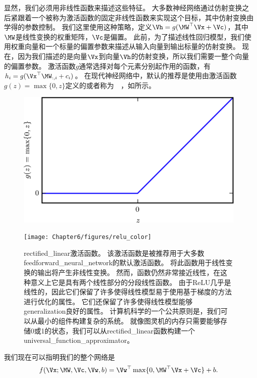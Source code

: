 
显然，我们必须用非线性函数来描述这些特征。
大多数神经网络通过仿射变换之后紧跟着一个被称为激活函数的固定非线性函数来实现这个目标，其中仿射变换由学得的参数控制。
我们这里使用这种策略，定义$\Vh=g(\MW^\top \Vx+\Vc)$，其中$\MW$是线性变换的权重矩阵，$\Vc$是偏置。
此前，为了描述线性回归模型，我们使用权重向量和一个标量的偏置参数来描述从输入向量到输出标量的仿射变换。
现在，因为我们描述的是向量$\Vx$到向量$\Vh$的仿射变换，所以我们需要一整个向量的偏置参数。
激活函数$g$通常选择对每个元素分别起作用的函数，有$h_i =g(\Vx^\top \MW_{:, i} + c_i)$。
在现代神经网络中，默认的推荐是使用由激活函数$g(z)=\max\{0, z\}$定义的或者称为~~\citep{Jarrett-et-al-2009,Nair-Hinton-2010,Glorot-et-al-2011a}，如所示。
\begin{figure}[!htb]
\ifOpenSource
\centerline{\includegraphics[scale=0.5]{images/45.png}}
\else
\centerline{\texttt{[image: Chapter6/figures/relu\_color]}}
\fi
\caption{\gls{rectified_linear}激活函数。
该激活函数是被推荐用于大多数\gls{feedforward_neural_network}的默认激活函数。
将此函数用于线性变换的输出将产生非线性变换。 然而，函数仍然非常接近线性，在这种意义上它是具有两个线性部分的分段线性函数。
由于\gls{ReLU}几乎是线性的，因此它们保留了许多使得线性模型易于使用基于梯度的方法进行优化的属性。 它们还保留了许多使得线性模型能够\gls{generalization}良好的属性。 计算机科学的一个公共原则是，我们可以从最小的组件构建复杂的系统。
就像图灵机的内存只需要能够存储0或1的状态，我们可以从\gls{rectified_linear}函数构建一个\gls{universal_function_approximator}。}
\label{fig:chap6_relu_color}
\end{figure}


我们现在可以指明我们的整个网络是
\begin{equation}
f(\Vx; \MW, \Vc, \Vw, b) = \Vw^\top \max\{ 0, \MW^\top \Vx + \Vc \} +b.
\end{equation}

